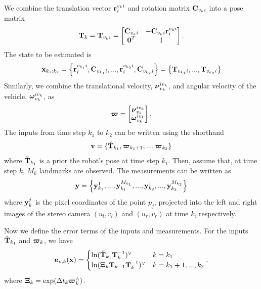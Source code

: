 \documentclass[a4paper]{article}
\begin{document}
We combine the translation vector $\bm{\mathbf{r}}_i^{v_k i}$ and rotation matrix $\bm{\mathbf{C}}_{v_k i}$ into a pose matrix
\begin{equation}
\bm{\mathbf{T}}_k = \bm{\mathbf{T}}_{v_k i} = \begin{bmatrix}
  \bm{\mathbf{C}}_{v_k i} & -\bm{\mathbf{C}}_{v_k i} \bm{\mathbf{r}}_i^{v_k i} \\ \bm{\mathbf{0}}^T & 1
\end{bmatrix}.
\end{equation}
The state to be estimated is
\begin{equation}
    \bm{\mathbf{x}}_{k_1: k_2} = \left\{ \bm{\mathbf{r}}_i^{v_{k_1} i}, \bm{\mathbf{C}}_{v_{k_1} i}, ..., \bm{\mathbf{r}}_i^{v_{k_2} i}, \bm{\mathbf{C}}_{v_{k_2} i} \right\} = \left\{ \bm{\mathbf{T}}_{v_{k_1} i}, ..., \bm{\mathbf{T}}_{v_{k_2} i} \right\}
\end{equation}
Similarly, we combine the translational velocity, $\bm{\mathbf{\nu}}_{v_k}^{i v_k}$, and angular velocity of the vehicle, $\bm{\mathbf{\omega}}_{v_k}^{i v_k}$, as 
\begin{equation}
    \bm{\mathbf{\varpi}} = \begin{bmatrix}
      \bm{\mathbf{\nu}}_{v_k}^{i v_k} \\ \bm{\mathbf{\omega}}_{v_k}^{i v_k}
    \end{bmatrix}.
\end{equation}
The inputs from time step $k_1$ to $k_2$ can be written using the shorthand
\begin{equation}
    \bm{\mathbf{v}} = \{ \check{\bm{\mathbf{T}}}_{k_1}, \bm{\mathbf{\varpi}}_{k_1+1}, ..., \bm{\mathbf{\varpi}}_{k_2} \}
\end{equation}
where $\check{\bm{\mathbf{T}}}_{k_1}$ is a prior the robot's pose at time step $k_1$. Then, assume that, at time step $k$, $M_k$ landmarks are observed. The measurements can be written as
\begin{equation}
    \bm{\mathbf{y}} = \left\{ \bm{\mathbf{y}}^{1}_{k_1}, ..., \bm{\mathbf{y}}^{M_{k_1}}_{k_1}, ..., \bm{\mathbf{y}}^{1}_{k_2}, ..., \bm{\mathbf{y}}^{M_{k_2}}_{k_2} \right\} 
\end{equation}
where $\bm{\mathbf{y}}_k^j$ is the pixel coordinates of the point $p_j$, projected into the left and right images of the stereo camera $(u_l, v_l)$ and $(u_r, v_r)$ at time $k$, respectively.

Now we define the error terms of the inputs and measurements. For the inputs $\check{\bm{\mathbf{T}}}_{k_1}$ and $\bm{\mathbf{\varpi}}_k$, we have 
\begin{equation}
    \bm{\mathbf{e}}_{v, k}(\bm{\mathbf{x}}) = \begin{cases}
    \ln (\check{\bm{\mathbf{T}}}_{k_1} \bm{\mathbf{T}}^{-1}_{k})^\vee & k = k_1\\
    \ln (\bm{\mathbf{\Xi}}_k \bm{\mathbf{T}}_{k-1} \bm{\mathbf{T}}_k^{-1})^\vee & k=k_1+1, ..., k_2
    \end{cases}.
\end{equation}
where $\bm{\mathbf{\Xi}}_k = \exp(\Delta t_k \bm{\mathbf{\varpi}}_k^\wedge)$.
\end{document}
